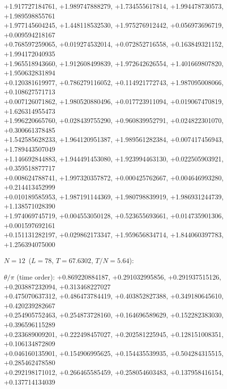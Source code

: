 \begin{flushleft}
+1.917727184761, +1.989747888279, +1.734555617814, +1.994478730573, +1.989598855761 \\
+1.977145604245, +1.448118532530, +1.975276912442, +0.056973696719, +0.009594218167 \\
+0.768597259065, +0.019274532014, +0.072852716558, +0.163849321152, +1.994172040935 \\
+1.965518943660, +1.912608499839, +1.972642626554, +1.401669807820, +1.950632831894 \\
+0.120381619977, +0.786279116052, +0.114921772743, +1.987095008066, +0.108627571713 \\
+0.007126071862, +1.980520880496, +0.017723911094, +0.019067470819, +1.626314955473 \\
+1.996220665760, +0.028439755290, +0.960839952791, +0.024822301070, +0.300661378485 \\
+1.542585628233, +1.964120951387, +1.989561282384, +0.007417456943, +1.789443507049 \\
+1.146692844883, +1.944491453080, +1.923994463130, +0.022505903921, +0.359518877717 \\
+0.008624788741, +1.997320357872, +0.000425762667, +0.004646993280, +0.214413452999 \\
+0.010189585953, +1.987191144369, +1.980798839919, +1.986931244739, +1.138571028390 \\
+1.974069745719, +0.004553050128, +0.523655693661, +0.014735901306, +0.001597692161 \\
+0.151131282197, +0.029862173347, +1.959656834714, +1.844060397783, +1.256394075000
\vspace{3pt}\par\noindent\textbf{$N=12$}\ ($L=78$, $T=67.6302$, $T/N=5.64$):
\par\noindent$\theta/\pi$ (time order):
+0.869220884187, +0.291032995856, +0.291937515126, +0.203887232094, +0.313468227027 \\
+0.475070637312, +0.486473784419, +0.403852827388, +0.349180645610, +0.420239282667 \\
+0.254905752463, +0.254873728160, +0.164696589629, +0.152282383030, +0.396596115289 \\
+0.233689009201, +0.222498457027, +0.202581225945, +0.128151008351, +0.106134872809 \\
+0.046160135901, +0.154906995625, +0.154435539935, +0.504284315515, +0.285462478580 \\
+0.292198171012, +0.266465585459, +0.258054603483, +0.137958416154, +0.137714134039 \\

\end{flushleft}
